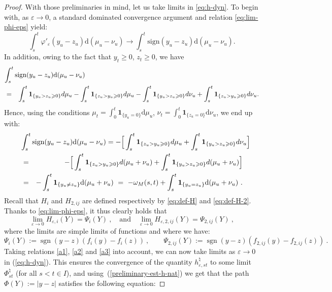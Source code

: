 \documentclass[11pt,reqno,oneside]{amsart}
\numberwithin{equation}{section}
\newcommand{\assign}{:=}
\newcommand{\mathd}{\mathrm{d}}
\newcommand{\tmop}[1]{\ensuremath{\operatorname{#1}}}
\newcommand{\ep}{\varepsilon}
\begin{document}
\begin{proof}
With those preliminaries in mind, let us take limits in \eqref{eq:h-dyn}. To begin with,
as $\ep \to 0$, a standard dominated convergence argument and relation \eqref{eq:lim-phi-eps} yield:
\begin{equation}\label{a1}
\int_s^t \varphi'_{\varepsilon} (y_u - z_u) \mathd (\mu_u - \nu_u) \to \int_s^t \text{sign} (y_u - z_u) \mathd (\mu_u - \nu_u).
\end{equation}
In addition, owing to the fact that $y_t\geqslant 0$, $z_t\geqslant 0$, we have
\begin{eqnarray*}
\lefteqn{\int_s^t \text{sign} (y_u - z_u) \mathd (\mu_u - \nu_u)}\\
&=& \int_s^t \mathbf{1}_{\{y_u>z_u \geqslant 0\}}  d\mu_u -\int_s^t \mathbf{1}_{\{z_u>y_u \geqslant 0\}}  d\mu_u-\int_s^t \mathbf{1}_{\{y_u>z_u \geqslant 0\}} d\nu_u+\int_s^t \mathbf{1}_{\{z_u>y_u \geqslant 0\}}  d\nu_u.
\end{eqnarray*}
Hence, using the conditions $\mu_t =\int_0^t \mathbf{1}_{\{y_u=0\}}\mathd \mu_u $, $\nu_t =\int_0^t \mathbf{1}_{\{z_u=0\}}\mathd \nu_u $, we end up with:
\begin{eqnarray}\label{a2}
\lefteqn{\int_s^t \text{sign} (y_u - z_u) \mathd (\mu_u - \nu_u)
=-\Big[\int_s^t \mathbf{1}_{\{z_u>y_u \geqslant 0\}}  d\mu_u+\int_s^t \mathbf{1}_{\{y_u>z_u \geqslant 0\}} d\nu_u \Big]} 
\notag\\
&=& -\Big[\int_s^t \mathbf{1}_{\{z_u>y_u \geqslant 0\}}  d(\mu_u+\nu_u)+\int_s^t \mathbf{1}_{\{y_u>z_u \geqslant 0\}} d(\mu_u+\nu_u) \Big]
\notag\\
&=& - \int_s^t \mathbf{1}_{\{y_u \neq z_u\}} \mathd (\mu_u + \nu_u)\ = \ - \omega_M (s, t) + \int_s^t \mathbf{1}_{\{y_u = z_u\}} \mathd (\mu_u +\nu_u) \ .
\end{eqnarray}
Recall that $H_i$ and $H_{2,ij}$ are defined respectively by \eqref{eq:def-H} and \eqref{eq:def-H-2}. Thanks to \eqref{eq:lim-phi-eps}, it thus clearly holds that
\begin{equation}\label{a3}
 \lim_{\ep\to 0} H_{\varepsilon,i} (Y) = \Psi_i (Y)\ ,
  \quad\text{and}\quad
 \lim_{\ep\to 0} H_{\varepsilon, 2,ij} (Y) 
     = \Psi_{2,ij} (Y) \ , 
\end{equation}
where the limits are simple limits of functions and where we have:
  \[ \Psi_i (Y) \assign \tmop{sgn} (y - z) (f_i (y) - f_i (z)) \ , \qquad \Psi_{2,ij} (Y) \assign \tmop{sgn} (y - z) (f_{2,ij} (y) - f_{2,ij} (z)) \ . \]
Taking relations \eqref{a1}, \eqref{a2} and \eqref{a3} into account, we can now take limits as $\varepsilon \rightarrow 0$ in (\ref{eq:h-dyn}). This ensures the convergence of the quantity $h_{\varepsilon,st}^{\natural}$ to some limit $\Phi^{\natural}_{st}$ (for all $s<t\in I$), and using~(\ref{preliminary-est-h-nat}) we get that the path $\Phi (Y) \assign | y - z |$ satisfies the following equation:

\end{proof}
\end{document}
